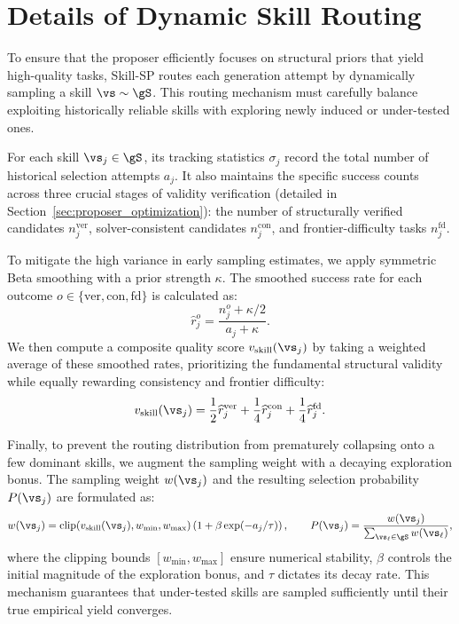\section{Details of Dynamic Skill Routing}
\label{app:skill_routing}

To ensure that the proposer efficiently focuses on structural priors that yield high-quality tasks, Skill-SP routes each generation attempt by dynamically sampling a skill $\vs \sim \gS$. This routing mechanism must carefully balance exploiting historically reliable skills with exploring newly induced or under-tested ones.

For each skill $\vs_j \in \gS$, its tracking statistics $\sigma_j$ record the total number of historical selection attempts $a_j$. It also maintains the specific success counts across three crucial stages of validity verification (detailed in Section~\ref{sec:proposer_optimization}): the number of structurally verified candidates $n_j^{\mathrm{ver}}$, solver-consistent candidates $n_j^{\mathrm{con}}$, and frontier-difficulty tasks $n_j^{\mathrm{fd}}$. 

To mitigate the high variance in early sampling estimates, we apply symmetric Beta smoothing with a prior strength $\kappa$. The smoothed success rate for each outcome $o \in \{\mathrm{ver}, \mathrm{con}, \mathrm{fd}\}$ is calculated as:
\begin{equation}
    \widehat{r}^{o}_j = \frac{n^{o}_j + \kappa/2}{a_j + \kappa}.
\end{equation}
We then compute a composite quality score $v_\text{skill}(\vs_j)$ by taking a weighted average of these smoothed rates, prioritizing the fundamental structural validity while equally rewarding consistency and frontier difficulty:
\begin{equation}
    v_\text{skill}(\vs_j)
    =
    \frac{1}{2}\widehat{r}^{\mathrm{ver}}_j
    +
    \frac{1}{4}\widehat{r}^{\mathrm{con}}_j
    +
    \frac{1}{4}\widehat{r}^{\mathrm{fd}}_j.
    \label{eq:app_skill_quality}
\end{equation}

Finally, to prevent the routing distribution from prematurely collapsing onto a few dominant skills, we augment the sampling weight with a decaying exploration bonus. The sampling weight $w(\vs_j)$ and the resulting selection probability $P(\vs_j)$ are formulated as:
\begin{equation}
    w(\vs_j)
    =
    \mathrm{clip}\!\left(v_\text{skill}(\vs_j), w_{\min}, w_{\max}\right) \left(1+\beta\exp(-a_j/\tau)\right),
    \qquad
    P(\vs_j)
    =
    \frac{w(\vs_j)}{\sum_{\vs_{\ell}\in\gS} w(\vs_{\ell})},
    \label{eq:app_skill_sampling}
\end{equation}
where the clipping bounds $[w_{\min}, w_{\max}]$ ensure numerical stability, $\beta$ controls the initial magnitude of the exploration bonus, and $\tau$ dictates its decay rate. This mechanism guarantees that under-tested skills are sampled sufficiently until their true empirical yield converges.



